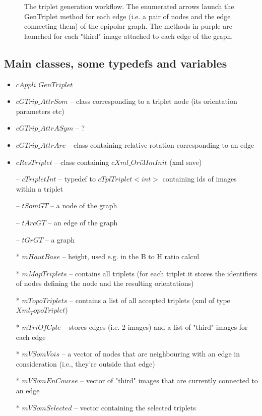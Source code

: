 \begin{figure}[h!]
\caption{The triplet generation workflow. The enumerated arrows launch the GenTriplet method for each edge (i.e. a pair of nodes and the edge connecting them) of the epipolar graph. The methods in purple are launched for each "third" image attached to each edge of the graph.}\label{fig:workf1GenTrip}
\end{figure}

\subsection{Main classes, some typedefs and variables}
\begin{itemize}
\item $cAppli\_GenTriplet$
\item $cGTrip\_AttrSom$ -- class corresponding to a triplet node (its orientation parameters etc)
\item $cGTrip\_AttrASym$ -- ?
\item $cGTrip\_AttrArc$ -- class containing relative rotation corresponding to an edge
\item $cResTriplet$ -- class containing $cXml\_Ori3ImInit$ (xml save)
\item[--] $cTripletInt$ -- typedef to $cTplTriplet<int>$ containing ids of images within a triplet
\item[--] $tSomGT$ -- a node of the graph
\item[--] $tArcGT$ -- an edge of the graph
\item[--] $tGrGT$ -- a graph  
\item[*] $mHautBase$ -- height, used e.g. in the B to H ratio calcul
\item[*] $mMapTriplets$ -- contains all triplets (for each triplet it stores the identifiers of nodes defining the node and the resulting orientations)
\item[*] $mTopoTriplets$ -- contains a list of all accepted triplets (xml of type $Xml_TopoTriplet$)
\item[*] $mTriOfCple$ -- stores edges (i.e. 2 images) and a list of "third" images for each edge 
\item[*] $mVSomVois$ -- a vector of nodes that are neighbouring with an edge in consideration (i.e., they're outside that edge)
\item[*] $mVSomEnCourse$ -- vector of "third" images that are currently connected to an edge
\item[*] $mVSomSelected$ -- vector containing the selected triplets
\end{itemize}

